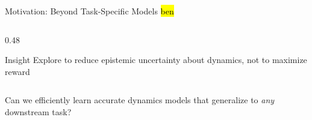 \documentclass[11pt,aspectratio=169]{beamer}
\begin{document}
\begin{frame}{Motivation: Beyond Task-Specific Models \hl{ben}}
\begin{columns}[T]
\begin{column}{0.48\textwidth}
\begin{itemize}
            \end{itemize}
            \vspace{0.5em}\pause
            \begin{block}{Insight}
                Explore to reduce \alert{epistemic uncertainty} about dynamics, not to maximize reward
            \end{block}
        \end{column}
    \end{columns}
    \vspace{0.5em}\pause
    \begin{center}
        \alert{
        Can we efficiently learn accurate dynamics models that generalize to \textit{any} downstream task?
        }
    \end{center}
\end{frame}

\end{document}
